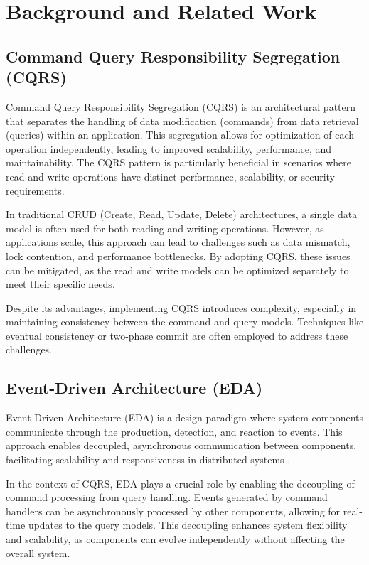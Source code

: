 \section{Background and Related Work}

\subsection{Command Query Responsibility Segregation (CQRS)}
Command Query Responsibility Segregation (CQRS) is an architectural pattern that separates the handling of data modification (commands) from data retrieval (queries) within an application. This segregation allows for optimization of each operation independently, leading to improved scalability, performance, and maintainability. The CQRS pattern is particularly beneficial in scenarios where read and write operations have distinct performance, scalability, or security requirements.

In traditional CRUD (Create, Read, Update, Delete) architectures, a single data model is often used for both reading and writing operations. However, as applications scale, this approach can lead to challenges such as data mismatch, lock contention, and performance bottlenecks. By adopting CQRS, these issues can be mitigated, as the read and write models can be optimized separately to meet their specific needs.

Despite its advantages, implementing CQRS introduces complexity, especially in maintaining consistency between the command and query models. Techniques like eventual consistency or two-phase commit are often employed to address these challenges.

\subsection{Event-Driven Architecture (EDA)}
Event-Driven Architecture (EDA) is a design paradigm where system components communicate through the production, detection, and reaction to events. This approach enables decoupled, asynchronous communication between components, facilitating scalability and responsiveness in distributed systems .

In the context of CQRS, EDA plays a crucial role by enabling the decoupling of command processing from query handling. Events generated by command handlers can be asynchronously processed by other components, allowing for real-time updates to the query models. This decoupling enhances system flexibility and scalability, as components can evolve independently without affecting the overall system.

